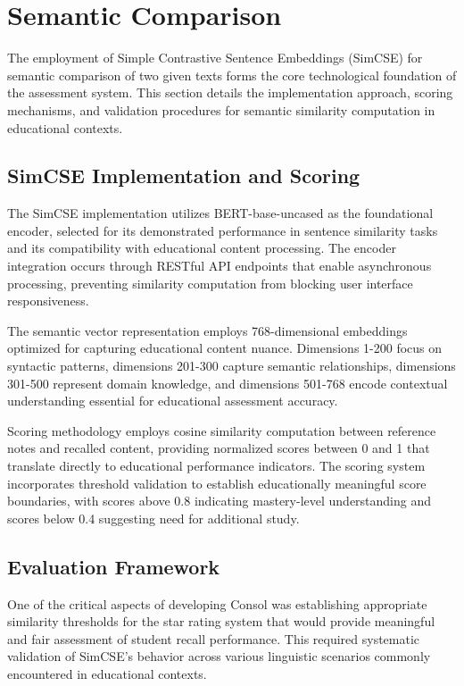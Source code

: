 {\color{maroon}
\section{Semantic Comparison}
\label{sec:semantic_comparison}

The employment of Simple Contrastive Sentence Embeddings (SimCSE) for semantic comparison of two given texts forms the core technological foundation of the assessment system. This section details the implementation approach, scoring mechanisms, and validation procedures for semantic similarity computation in educational contexts.

\subsection{SimCSE Implementation and Scoring}

The SimCSE implementation utilizes BERT-base-uncased as the foundational encoder, selected for its demonstrated performance in sentence similarity tasks and its compatibility with educational content processing. The encoder integration occurs through RESTful API endpoints that enable asynchronous processing, preventing similarity computation from blocking user interface responsiveness.

The semantic vector representation employs 768-dimensional embeddings optimized for capturing educational content nuance. Dimensions 1-200 focus on syntactic patterns, dimensions 201-300 capture semantic relationships, dimensions 301-500 represent domain knowledge, and dimensions 501-768 encode contextual understanding essential for educational assessment accuracy.

Scoring methodology employs cosine similarity computation between reference notes and recalled content, providing normalized scores between 0 and 1 that translate directly to educational performance indicators. The scoring system incorporates threshold validation to establish educationally meaningful score boundaries, with scores above 0.8 indicating mastery-level understanding and scores below 0.4 suggesting need for additional study.

\subsection{Evaluation Framework}

One of the critical aspects of developing Consol was establishing appropriate similarity thresholds for the star rating system that would provide meaningful and fair assessment of student recall performance. This required systematic validation of SimCSE's behavior across various linguistic scenarios commonly encountered in educational contexts.

}
